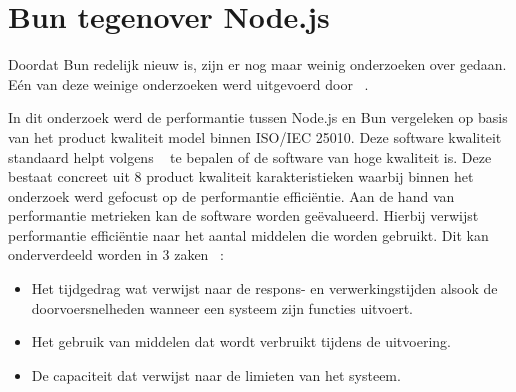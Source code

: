 \section{Bun tegenover Node.js}
Doordat Bun redelijk nieuw is, zijn er nog maar weinig onderzoeken over gedaan. Eén van deze weinige
onderzoeken werd uitgevoerd door ~\textcite{Feroj2023}. 

In dit onderzoek werd de performantie tussen Node.js en Bun vergeleken op basis van het product kwaliteit model binnen ISO/IEC 25010.
Deze software kwaliteit standaard helpt volgens ~\textcite{Britton2021} te bepalen of de software van hoge kwaliteit is.
Deze bestaat concreet uit 8 product kwaliteit karakteristieken waarbij binnen het onderzoek werd gefocust op de performantie efficiëntie.
Aan de hand van performantie metrieken kan de software worden geëvalueerd. 
Hierbij verwijst performantie efficiëntie naar het aantal middelen die worden gebruikt.
Dit kan onderverdeeld worden in 3 zaken ~\autocite{Britton2021}:
\begin{itemize}
    \item Het tijdgedrag wat verwijst naar de respons- en verwerkingstijden alsook de doorvoersnelheden wanneer een systeem zijn functies uitvoert.
    \item Het gebruik van middelen dat wordt verbruikt tijdens de uitvoering.
    \item De capaciteit dat verwijst naar de limieten van het systeem.
\end{itemize}



